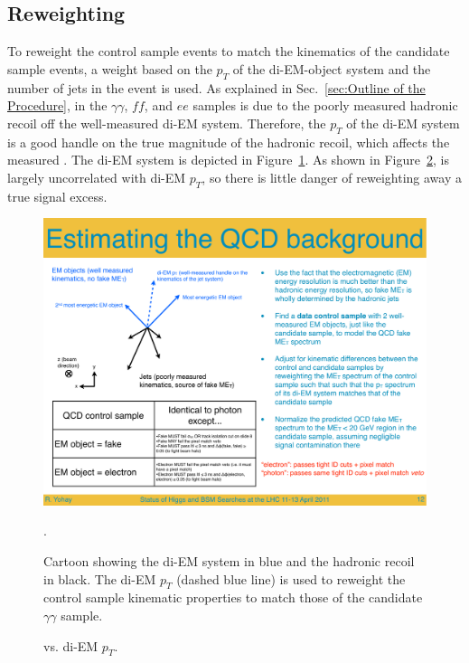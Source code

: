\documentclass[dissertation.tex]{subfiles}
\begin{document}
\subsection{Reweighting}
\label{sec:Reweighting}

To reweight the control sample events to match the kinematics of the candidate sample events, a weight based on the $p_{T}$ of the di-EM-object system and the number of jets in the event is used.  As explained in Sec.~\ref{sec:Outline of the Procedure}, \MET in the $\gamma\gamma$, $\mathit{ff}$, and $ee$ samples is due to the poorly measured hadronic recoil off the well-measured di-EM system.  Therefore, the $p_{T}$ of the di-EM system is a good handle on the true magnitude of the hadronic recoil, which affects the measured \MET.  The di-EM system is depicted in Figure~\ref{fig:di-EM_pT_cartoon}.  As shown in Figure~\ref{fig:MET_vs_di-EM_pT}, \MET is largely uncorrelated with di-EM $p_{T}$, so there is little danger of reweighting away a true signal excess.

\begin{figure}
	\centering
	\includegraphics[scale=0.5]{di-EM_pT_cartoon}
	\caption{Cartoon showing the di-EM system in blue and the hadronic recoil in black.  The di-EM $p_{T}$ (dashed blue line) is used to reweight the control sample kinematic properties to match those of the candidate $\gamma\gamma$ sample.}.
	\label{fig:di-EM_pT_cartoon}
\end{figure}

\begin{figure}
	\centering
	\hspace{1cm}
	\hspace{1cm}
	\caption{\MET vs. di-EM $p_{T}$.}
	\label{fig:MET_vs_di-EM_pT}
\end{figure}
\end{document}
